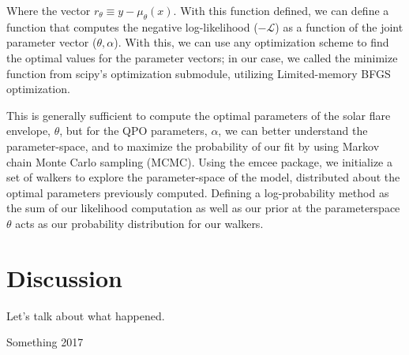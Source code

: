 \documentclass{aastex61}
\begin{document}
Where the vector $r_\theta \equiv y-\mu_\theta (x)$. With this function defined, we can define a function that computes the negative log-likelihood ($-\mathcal{L}$) as a function of the joint parameter vector ($\theta, \alpha$).
With this, we can use any optimization scheme to find the optimal values for the parameter vectors; in our case, we called the minimize function from scipy's optimization submodule, utilizing Limited-memory BFGS optimization.

This is generally sufficient to compute the optimal parameters of the solar flare envelope, $\theta$, but for the QPO parameters, $\alpha$, we can better understand the parameter-space, and to maximize the probability of our fit by using Markov chain Monte Carlo sampling (MCMC).
Using the emcee package, we initialize a set of walkers to explore the parameter-space of the model, distributed about the optimal parameters previously computed. Defining a log-probability method as the sum of our likelihood computation as well as our prior at the parameterspace $\theta$ acts as our probability distribution for our walkers.


\section{Discussion} \label{sec:discussion}
Let's talk about what happened.





\begin{thebibliography}{}
	Something 2017
\end{thebibliography}
\end{document}
